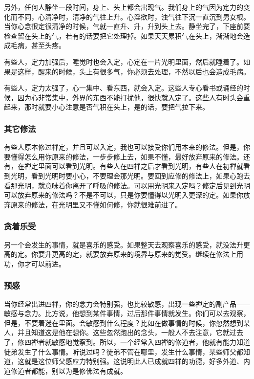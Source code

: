 \documentclass{book}
\begin{document}
另外，任何人静坐一段时间，身上、头上都会出现气。我们身上的气因为定力的变化而不同，心清净时，清净的气往上升。心淫欲时，浊气往下沉一直沉到男女根。当你心念很定很清净的时候，气就一直升、升，升到头上去。静坐完了，下座前要检查留在头上的气，若有的话要把它处理掉。如果天天累积气在头上，渐渐地会造成毛病，甚至头疼。

有些人，定力加强后，睡觉时也会入定，心定在一片光明里面，然后就睡着了。如果是这样，醒来的时候，头上有很多气，你必须去处理，不然以后也会造成毛病。

有些人，定力太强了，心一集中、看东西，就会入定。这些人专心看书或诵经的时候，因为心非常集中，外界的东西不能打扰他，很快就入定了。这些人有时头会重起来，那时就要小心注意是否气积在头上，是的话，要把气拉下来。

\subsubsection{其它修法}

有些人原本修过禅定，并且可以入定，我也可以接受你们用本来的修法。但是，你要懂得怎么用你原来的修法，一步步修上去，如果不懂，最好放弃原来的修法。还有，在禅定里面可以看到光明。有些人在四禅之后才看到光明，有些人在初禅就看到光明，看到光明时要小心，不要理会那光明。要回到应修的修法上，如果心跑去看那光明，就意味着你离开了呼吸的修法。可以用光明来入定吗？修定后见到光明可以放弃原来的修法吗？不是不可以，只是你要懂得以光明入更深的定。如果你放弃原来的修法，在光明里又不懂如何修，你就很难前进了。

\subsubsection{贪着乐受}

另一个会发生的事情，就是喜乐的感受。如果整天去观察喜乐的感受，就没法升更高的定。你要升更高的定，就要放弃原来的境界与原来的觉受。继续在修法上用功，你才可以前进。

\subsubsection{预感}

当你经常出进四禅，你的念力会特别强，也比较敏感，出现一些禅定的副产品——敏感与念力。比方说，他想到某件事情，过后那件事情就发生。你们可以去观察，但是，不要着迷在里面。会敏感到什么程度？比如在做事情的时候，你忽然想到某人，并且知道这是他在想你。这些忽然跑出的念头，一般人不去注意，它就过去了，修四禅者就敏感地觉察到。所以，一个经常入四禅的修道者，他就有能力知道徒弟发生了什么事情。听说过吗？徒弟不管在哪里，发生什么事情，某些师父都知道，这就是这位师父感应力特别强。这说明此人已成就四禅的功德，好多外道、内道修道者都能，别以为是修佛法有成就。
\end{document}
